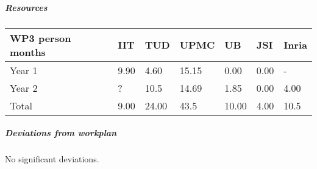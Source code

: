 
\subparagraph{Resources}

\begin{center}
\begin{tabular}{|C{2cm}|C{2cm}|C{2cm}|C{2cm}|C{2cm}|C{2cm}|C{2cm}|}
\hline
\footnotesize \textbf{WP3 person months}& \footnotesize \textbf{IIT}&\footnotesize \textbf{TUD}&\footnotesize \textbf{UPMC}& \footnotesize \textbf{UB} &\footnotesize \textbf{JSI} &\footnotesize \textbf{Inria}\\ \hline
\footnotesize Year 1 &  9.90 & 4.60 & 15.15 & 0.00 & 0.00 &  -   \\  \hline
\footnotesize Year 2 &  ? & 10.5 & 14.69 & 1.85 & 0.00 &  4.00  \\  \hline
\footnotesize Total &  9.00	 & 24.00 & 43.5 & 10.00 & 4.00 & 10.5 \\ \hline
\end{tabular}
\end{center}

\subparagraph{Deviations from workplan} 
No significant deviations. 

